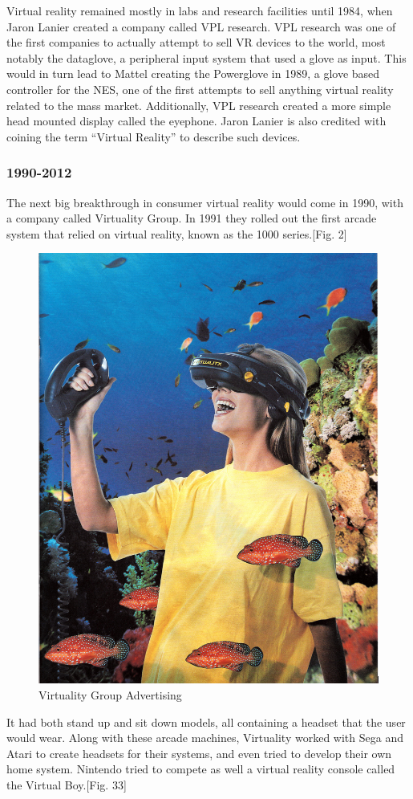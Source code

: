 \documentclass[a4paper,10pt,twoside]{article}
\begin{document}
	Virtual reality remained mostly in labs and research facilities until 1984, when Jaron Lanier created a company called VPL research.  VPL research was one of the first companies to actually attempt to sell VR devices to the world, most notably the dataglove, a peripheral input system that used a glove as input.  This would in turn lead to Mattel creating the Powerglove in 1989, a glove based controller for the NES, one of the first attempts to sell anything virtual reality related to the mass market.  Additionally, VPL research created a more simple head mounted display called the eyephone. Jaron Lanier is also credited with coining the term “Virtual Reality” to describe such devices.  
	\subsubsection{1990-2012}
	The next big breakthrough in consumer virtual reality would come in 1990, with a company called Virtuality Group.  In 1991 they rolled out the first arcade system that relied on virtual reality, known as the 1000 series.[Fig. 2]  
		\begin{figure}[H]
			\includegraphics[scale=0.5]{virtuality.jpg}
			\caption{Virtuality Group Advertising}
			\label{fig:virtuality}
		\end{figure}It had both stand up and sit down models, all containing a headset that the user would wear.  Along with these arcade machines, Virtuality worked with Sega and Atari to create headsets for their systems, and even tried to develop their own home system.  Nintendo tried to compete as well a virtual reality console called the Virtual Boy.[Fig. 33]
\end{document}
